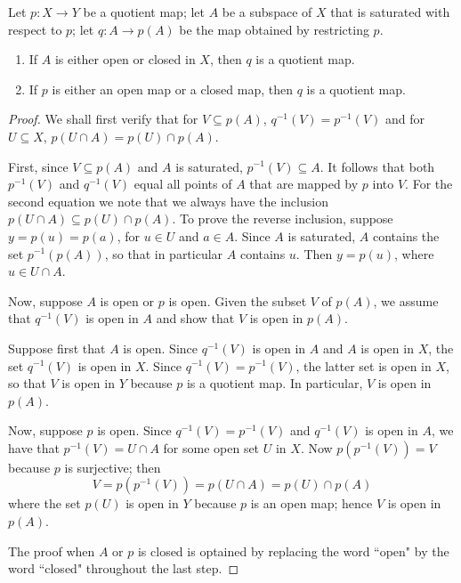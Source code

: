 \documentclass[12pt, a4paper, oneside, openright, titlepage]{book}
\begin{document}
\begin{thm}
    Let $p:X\rightarrow Y$ be a quotient map; let $A$ be a subspace of $X$ that is saturated with respect to $p$; let $q:A\rightarrow p(A)$ be the map obtained by restricting $p$. \begin{enumerate}
        \item If $A$ is either open or closed in $X$, then $q$ is a quotient map.
        \item If $p$ is either an open map or a closed map, then $q$ is a quotient map.
    \end{enumerate}
\end{thm}
\begin{proof}
    We shall first verify that for $V \subseteq p(A)$, $q^{-1}(V) = p^{-1}(V)$ and for $U \subseteq X$, $p(U\cap A) = p(U)\cap p(A)$.

    First, since $V \subseteq p(A)$ and $A$ is saturated, $p^{-1}(V) \subseteq A$. It follows that both $p^{-1}(V)$ and $q^{-1}(V)$ equal all points of $A$ that are mapped by $p$ into $V$. For the second equation we note that we always have the inclusion $p(U\cap A) \subseteq p(U)\cap p(A)$. To prove the reverse inclusion, suppose $y = p(u) = p(a)$, for $u \in U$ and $a \in A$. Since $A$ is saturated, $A$ contains the set $p^{-1}(p(A))$, so that in particular $A$ contains $u$. Then $y = p(u)$, where $u \in U\cap A$.

    Now, suppose $A$ is open or $p$ is open. Given the subset $V$ of $p(A)$, we assume that $q^{-1}(V)$ is open in $A$ and show that $V$ is open in $p(A)$.

    Suppose first that $A$ is open. Since $q^{-1}(V)$ is open in $A$ and $A$ is open in $X$, the set $q^{-1}(V)$ is open in $X$. Since $q^{-1}(V) = p^{-1}(V)$, the latter set is open in $X$, so that $V$ is open in $Y$ because $p$ is a quotient map. In particular, $V$ is open in $p(A)$.

    Now, suppose $p$ is open. Since $q^{-1}(V) = p^{-1}(V)$ and $q^{-1}(V)$ is open in $A$, we have that $p^{-1}(V) = U\cap A$ for some open set $U$ in $X$. Now $p(p^{-1}(V)) = V$ because $p$ is surjective; then \begin{equation*}
        V = p(p^{-1}(V)) = p(U\cap A) = p(U)\cap p(A)
    \end{equation*}
    where the set $p(U)$ is open in $Y$ because $p$ is an open map; hence $V$ is open in $p(A)$.

    The proof when $A$ or $p$ is closed is optained by replacing the word ``open" by the word ``closed" throughout the last step.
\end{proof}
\end{document}
